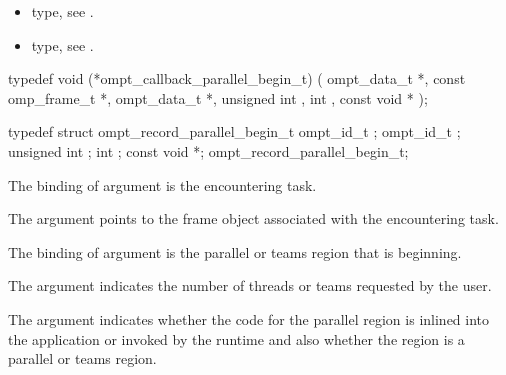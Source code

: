\crossreferences
\begin{itemize}
\item {} type, see
.
\item {} type, see
.
\end{itemize}


\label{sec:ompt_callback_parallel_begin_t}
\format

\begin{ccppspecific}
\begin{omptCallback}
typedef void (*ompt_callback_parallel_begin_t) (
  ompt_data_t *,
  const omp_frame_t *,
  ompt_data_t *,
  unsigned int ,
  int ,
  const void *
);
\end{omptCallback}
\end{ccppspecific}


\record

\begin{ccppspecific}
\begin{omptRecord}
typedef struct ompt_record_parallel_begin_t {
  ompt_id_t ;
  ompt_id_t ;
  unsigned int ;
  int ;
  const void *;
} ompt_record_parallel_begin_t;
\end{omptRecord}
\end{ccppspecific}


\argdesc

The binding of argument  is the
encountering task.

The argument  points to the frame object
associated with the encountering task.

The binding of argument  is the parallel or teams
region that is beginning.

The argument 
indicates the number of threads or teams requested by the user.

The argument  indicates whether the code for the
parallel region is inlined into the application or invoked by the
runtime and also whether the region is a parallel or teams region.

\codeptrdesc

